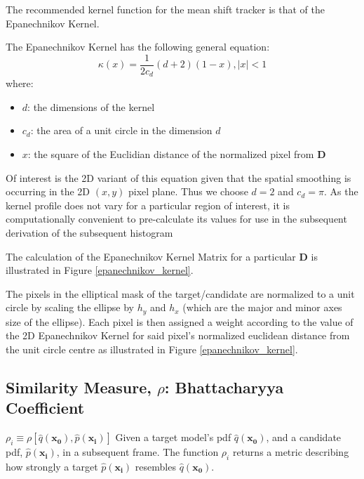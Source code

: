 The recommended kernel function for the mean shift tracker is that of the
Epanechnikov Kernel.

The Epanechnikov Kernel has the following general equation:
\begin{equation}
    \kappa(x)=\frac{1}{2 c_d}(d+2)(1-x), |x|<1
\end{equation}
where:
\begin{itemize}
   \item $d$: the dimensions of the kernel
   \item $c_d$: the area of a unit circle in the dimension $d$
   \item $x$: the square of the Euclidian distance of the normalized pixel from $\mathbf{D}$
\end{itemize}

Of interest is the 2D variant of this equation given that the spatial smoothing
is occurring in the 2D $(x,y)$ pixel plane. Thus we choose $d=2$ and $c_d=\pi$.
As the kernel profile does not vary for a particular region of interest, it is
computationally convenient to pre-calculate its values for use in the subsequent
derivation of the subsequent histogram

The calculation of the Epanechnikov Kernel Matrix for a particular $\mathbf{D}$ is
illustrated in Figure \ref{epanechnikov_kernel}.


The pixels in the elliptical mask of the target/candidate are normalized to a unit
circle by scaling the ellipse by $h_y$ and $h_x$ (which are the major and minor
axes size of the ellipse). Each pixel is then assigned a weight according to the
value of the 2D Epanechnikov Kernel for said pixel's normalized euclidean
distance from the unit circle centre as illustrated in Figure \ref{epanechnikov_kernel}.

\subsection{Similarity Measure, $\rho$: Bhattacharyya Coefficient}

$\rho_i \equiv \rho[\hat{q}(\mathbf{x_0}),\hat{p}(\mathbf{x_i})]$
Given a target model's pdf $\hat{q}(\mathbf{x_0})$, and a candidate pdf,
$\hat{p}(\mathbf{x_i})$, in a subsequent frame.  The function $\rho_i$ returns a
metric describing how strongly a target $\hat{p}(\mathbf{x_i})$ resembles
$\hat{q}(\mathbf{x_0})$.

